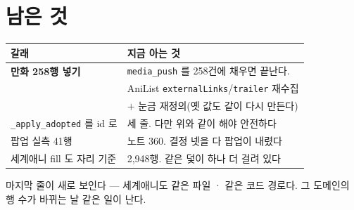 \documentclass[11pt]{article}
\begin{document}
\section{남은 것}

\begin{center}
\begin{tabular}{ll}
\hline
갈래 & 지금 아는 것 \\
\hline
\textbf{만화 258행 넣기} & \texttt{media\_push} 를 258건에 채우면 끝난다. \\
 & AniList \texttt{externalLinks}/\texttt{trailer} 재수집 \\
 & $+$ 눈금 재정의(옛 값도 같이 다시 만든다) \\
\texttt{\_apply\_adopted} 를 id 로 & 세 줄. 다만 위와 같이 해야 안전하다 \\
팝업 실측 41행 & 노트 360. 결정 넷을 다 팝업이 내렸다 \\
세계애니 fill 도 자리 기준 & 2,948행. 같은 덫이 하나 더 걸려 있다 \\
\hline
\end{tabular}
\end{center}

마지막 줄이 새로 보인다 --- 세계애니도 같은 파일 · 같은 코드 경로다.
그 도메인의 행 수가 바뀌는 날 같은 일이 난다.
\end{document}
